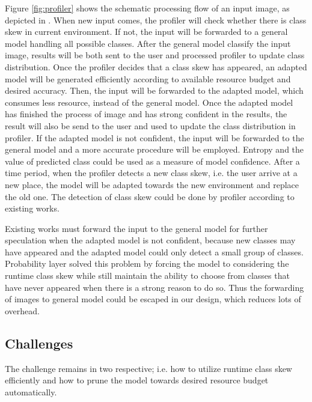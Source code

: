 \documentclass[pageno]{jpaper}
\begin{document}
Figure \ref{fig:profiler} shows the schematic processing flow of an input image, as depicted in . When new input comes, the profiler will check whether there is class skew in current environment. If not, the input will be forwarded to a general model handling all possible classes. After the general model classify the input image, results will be both sent to the user and processed profiler to update class distribution. Once the profiler decides that a class skew has appeared, an adapted model will be generated efficiently according to available resource budget and desired accuracy. Then, the input will be forwarded to the adapted model, which consumes less resource, instead of the general model. Once the adapted model has finished the process of image and has strong confident in the results, the result will also be send to the user and used to update the class distribution in profiler. If the adapted model is not confident, the input will be forwarded to the general model and a more accurate procedure will be employed. Entropy and the value of predicted class could be used as a measure of model confidence. After a time period, when the profiler detects a new class skew, i.e. the user arrive at a new place, the model will be adapted towards the new environment and replace the old one. The detection of class skew could be done by profiler according to existing works. 

Existing works must forward the input to the general model for further speculation when the adapted model is not confident, because new classes may have appeared and the adapted model could only detect a small group of classes. Probability layer solved this problem by forcing the model to considering the runtime class skew while still maintain the ability to choose from classes that have never appeared when there is a strong reason to do so. Thus the forwarding of images to general model could be escaped in our design, which reduces lots of overhead.







\subsection{Challenges}
The challenge remains in two respective; i.e. how to utilize runtime class skew efficiently and how to prune the model towards desired resource budget automatically. 
\end{document}
